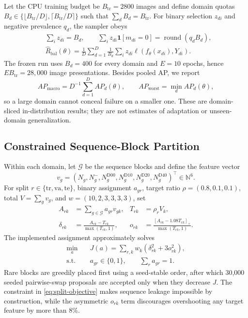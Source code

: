 \documentclass[conference]{ieee-template/vendor/IEEEtran/IEEEtran}
\begin{document}
Let the CPU training budget be $B_{\mathrm{tr}}=2800$ images and define domain
quotas $B_d\in\{\lfloor B_{\mathrm{tr}}/D\rfloor,
\lceil B_{\mathrm{tr}}/D\rceil\}$ such that $\sum_dB_d=B_{\mathrm{tr}}$.
For binary selection $z_{di}$ and negative prevalence $q_d$, the sampler obeys
\begin{equation}
\begin{aligned}
 &\sum_i z_{di}=B_d,\qquad
 \sum_i z_{di}\mathbf 1[m_{di}=0]=\operatorname{round}(q_dB_d),\\
 &\widehat R_{\mathrm{bal}}(\theta)=\frac1D\sum_{d=1}^D
 \frac1{B_d}\sum_i z_{di}\ell(f_\theta(x_{di}),Y_{di}).
\end{aligned}
 \label{eq:balanced-budget}
\end{equation}
The frozen run uses $B_d=400$ for every domain and $E=10$ epochs, hence
$EB_{\mathrm{tr}}=28{,}000$ image presentations. Besides pooled AP, we report
\begin{equation}
 AP_{\mathrm{macro}}=D^{-1}\sum_{d=1}^D AP_d(\theta),\qquad
 AP_{\mathrm{worst}}=\min_d AP_d(\theta),
 \label{eq:macro-worst}
\end{equation}
so a large domain cannot conceal failure on a smaller one. These are
domain-sliced in-distribution results; they are not estimates of adaptation or
unseen-domain generalization.

\subsection{Constrained Sequence-Block Partition}
Within each domain, let $\mathcal G$ be the sequence blocks and define the
feature vector
\begin{equation}
 v_g=(N_g,N_g^-,N_g^{\mathrm{D00}},N_g^{\mathrm{D10}},
 N_g^{\mathrm{D20}},N_g^{\mathrm{D40}})^\top\in\mathbb N^6.
\end{equation}
For split $r\in\{\mathrm{tr},\mathrm{va},\mathrm{te}\}$, binary assignment
$a_{gr}$, target ratio $\rho=(0.8,0.1,0.1)$, total $V=\sum_gv_g$, and
$w=(10,2,3,3,3,3)$, set
\begin{align}
 A_{rk}&=\sum_{g\in\mathcal G}a_{gr}v_{gk}, & T_{rk}&=\rho_rV_k,\\
 \delta_{rk}&=\frac{A_{rk}-T_{rk}}{\max(T_{rk},1)}, &
 o_{rk}&=\frac{[A_{rk}-1.08T_{rk}]_+}{\max(T_{rk},1)}.
\end{align}
The implemented assignment approximately solves
\begin{equation}
\begin{aligned}
 \min_a\quad &J(a)=\sum_{r,k}w_k(\delta_{rk}^2+3o_{rk}^2),\\
 \mathrm{s.t.}\quad &a_{gr}\in\{0,1\},\qquad
 \sum_ra_{gr}=1.
\end{aligned}
 \label{eq:split-objective}
\end{equation}
Rare blocks are greedily placed first using a seed-stable order, after which
30,000 seeded pairwise-swap proposals are accepted only when they decrease
$J$. The constraint in \eqref{eq:split-objective} makes sequence leakage
impossible by construction, while the asymmetric $o_{rk}$ term discourages
overshooting any target feature by more than 8\%.
\end{document}
